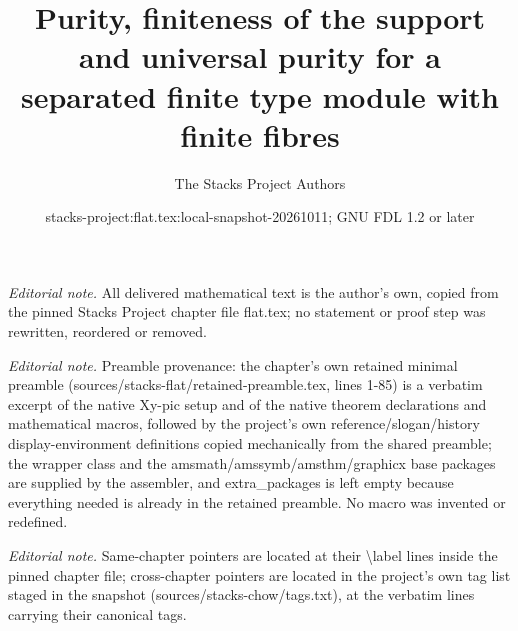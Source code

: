 \documentclass[10pt,a4paper]{amsart}
\title{Purity, finiteness of the support and universal purity for a separated finite type module with finite fibres}
\author{The Stacks Project Authors}
\date{stacks-project:flat.tex:local-snapshot-20261011; GNU FDL 1.2 or later}
\theoremstyle{plain}
\theoremstyle{definition}
\theoremstyle{remark}
\numberwithin{equation}{subsection}
\begin{document}
\maketitle
\noindent\textit{Editorial note.} All delivered mathematical text is the author's own, copied from the pinned Stacks Project chapter file flat.tex; no statement or proof step was rewritten, reordered or removed.\par\medskip
\noindent\textit{Editorial note.} Preamble provenance: the chapter's own retained minimal preamble (sources/stacks-flat/retained-preamble.tex, lines 1-85) is a verbatim excerpt of the native Xy-pic setup and of the native theorem declarations and mathematical macros, followed by the project's own reference/slogan/history display-environment definitions copied mechanically from the shared preamble; the wrapper class and the amsmath/amssymb/amsthm/graphicx base packages are supplied by the assembler, and extra\_packages is left empty because everything needed is already in the retained preamble. No macro was invented or redefined.\par\medskip
\noindent\textit{Editorial note.} Same-chapter pointers are located at their \textbackslash{}label lines inside the pinned chapter file; cross-chapter pointers are located in the project's own tag list staged in the snapshot (sources/stacks-chow/tags.txt), at the verbatim lines carrying their canonical tags.\par\medskip
\end{document}
